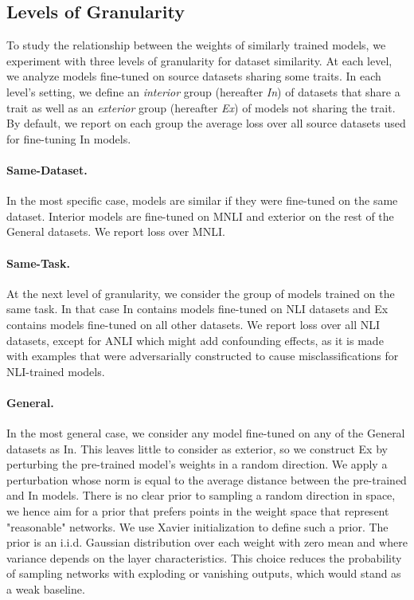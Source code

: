 \documentclass[nohyperref]{article}
\theoremstyle{plain}
\theoremstyle{definition}
\theoremstyle{remark}
\begin{document}
\subsection{Levels of Granularity}\label{sec:granularity_levels} 
To study the relationship between the weights of similarly trained models, we experiment with three levels of granularity for dataset similarity. At each level, we analyze models fine-tuned on source datasets sharing some traits. In each level's setting, we define an \emph{interior} group (hereafter \emph{In}) of datasets that share a trait as well as an \emph{exterior} group (hereafter \emph{Ex}) of models not sharing the trait. By default, we report on each group the average loss over all source datasets used for fine-tuning In models.

\paragraph{Same-Dataset.} \label{sec:behavior_per_seed}
In the most specific case, models are similar if they were fine-tuned on the same dataset. Interior models are fine-tuned on MNLI \citep{williams-etal-2018-broad} and exterior on the rest of the General datasets. We report loss over MNLI. 

\paragraph{Same-Task.} At the next level of granularity, we consider the group of models trained on the same task. In that case In contains models fine-tuned on NLI datasets and Ex contains models fine-tuned on all other datasets. We report loss over all NLI datasets, except for ANLI which might add confounding effects, as it is made with examples that were adversarially constructed to cause misclassifications for NLI-trained models. \label{sec:behavior_per_task}

\paragraph{General.} In the most general case, we consider any model fine-tuned on any of the General datasets as In. This leaves little to consider as exterior, so we construct Ex by perturbing the pre-trained model's weights in a random direction. We apply a perturbation whose norm is equal to the average distance between the pre-trained and In models. There is no clear prior to sampling a random direction in space, we hence aim for a prior that prefers points in the weight space that represent "reasonable" networks. We use Xavier initialization \citep{xavierInit} to define such a prior. The prior is an i.i.d. Gaussian distribution over each weight with zero mean and where variance depends on the layer characteristics. This choice reduces the probability of sampling networks with exploding or vanishing outputs, which would stand as a weak baseline.
 \label{sec:behavior_per_fine-tuning}
\end{document}
